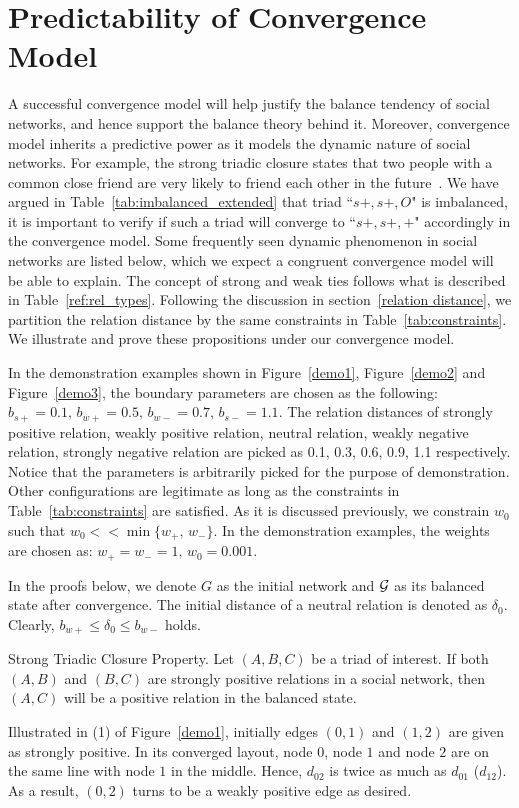 \section{Predictability of Convergence Model}\label{predictability}
A successful convergence model will help justify the balance tendency of social networks, and hence support the balance theory behind it. Moreover, convergence model inherits a predictive power as it models the dynamic nature of social networks. For example, the strong triadic closure states that two people with a common close friend are very likely to friend each other in the future~\cite{Granovetter:1973}. We have argued in Table~\ref{tab:imbalanced_extended} that triad ``$s+, s+, O$" is imbalanced, it is important to verify if such a triad will converge to ``$s+, s+, +$" accordingly in the convergence model. Some frequently seen dynamic phenomenon in social networks are listed below, which we expect a congruent convergence model will be able to explain. The concept of strong and weak ties follows what is described in Table~\ref{ref:rel_types}. Following the discussion in section~\ref{relation distance}, we partition the relation distance by the same constraints in Table~\ref{tab:constraints}. We illustrate and prove these propositions under our convergence model.

 In the demonstration examples shown in Figure~\ref{demo1}, Figure~\ref{demo2} and Figure~\ref{demo3}, the boundary parameters are chosen as the following: $b_{s+}=0.1,\, b_{w+}=0.5,\,  b_{w-}=0.7,\,b_{s-} = 1.1$. The relation distances of strongly positive relation, weakly positive relation, neutral relation, weakly negative relation, strongly negative relation are picked as 0.1, 0.3, 0.6, 0.9, 1.1 respectively. Notice that the parameters is arbitrarily picked for the purpose of demonstration. Other configurations are legitimate as long as the constraints in Table~\ref{tab:constraints} are satisfied. As it is discussed previously, we constrain $w_{0}$ such that $w_{0}<< \min{\{w_{+}, \, w_{-}\}}$. In the demonstration examples, the weights are chosen as: $w_{+}=w_{-}=1,\, w_{0}=0.001$.
 
 In the proofs below, we denote $G$ as the initial network and $\cal G$ as its balanced state after convergence. The initial distance of a neutral relation is denoted as $\delta_{0}$. Clearly, $b_{w+} \leq \delta_{0} \leq b_{w-}$ holds.
 
\begin{proposition}\label{closure}
Strong Triadic Closure Property. Let $(A,B,C)$ be a triad of interest. If both $(A,B)$ and $(B,C)$ are strongly positive relations in a social network, then $(A,C)$ will be a positive relation in the balanced state.
\end{proposition}
Illustrated in (1) of Figure~\ref{demo1}, initially edges $(0,1)$ and $(1,2)$ are given as strongly positive. In its converged layout, node $0$, node $1$ and node $2$ are on the same line with node $1$ in the middle. Hence, $d_{02}$ is twice as much as $d_{01}$ ($d_{12}$). As a result, $(0,2)$ turns to be a weakly positive edge as desired. 

